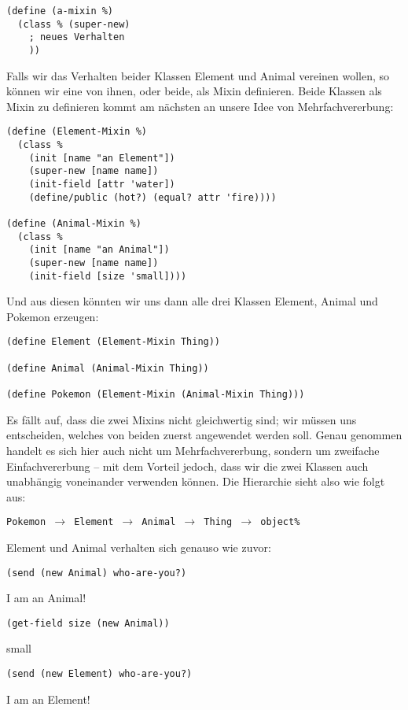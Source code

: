 \begin{lstlisting}
(define (a-mixin %)
  (class % (super-new)
    ; neues Verhalten
    ))
\end{lstlisting}

Falls wir das Verhalten beider Klassen Element und Animal vereinen wollen, so können wir eine von ihnen, oder beide, als Mixin definieren. Beide Klassen als Mixin zu definieren kommt am nächsten an unsere Idee von Mehrfachvererbung:

\begin{lstlisting}
(define (Element-Mixin %)
  (class % 
    (init [name "an Element"])
    (super-new [name name])
    (init-field [attr 'water])
    (define/public (hot?) (equal? attr 'fire))))

(define (Animal-Mixin %)
  (class %
    (init [name "an Animal"])
    (super-new [name name])
    (init-field [size 'small])))
\end{lstlisting}

Und aus diesen könnten wir uns dann alle drei Klassen Element, Animal und Pokemon erzeugen:
\begin{lstlisting}
(define Element (Element-Mixin Thing))

(define Animal (Animal-Mixin Thing))
 
(define Pokemon (Element-Mixin (Animal-Mixin Thing)))
\end{lstlisting}

Es fällt auf, dass die zwei Mixins nicht gleichwertig sind; wir müssen uns entscheiden, welches von beiden zuerst angewendet werden soll. Genau genommen handelt es sich hier auch nicht um Mehrfachvererbung, sondern um zweifache Einfachvererbung -- mit dem Vorteil jedoch, dass wir die zwei Klassen auch unabhängig voneinander verwenden können. Die Hierarchie sieht also wie folgt aus:

\texttt{Pokemon $\rightarrow$ Element $\rightarrow$ Animal $\rightarrow$ Thing $\rightarrow$ object\%}

Element und Animal verhalten sich genauso wie zuvor:

\begin{lstlisting}
(send (new Animal) who-are-you?)
\end{lstlisting}
{\routput {\qq}I am an Animal!\qq}

\begin{lstlisting}
(get-field size (new Animal))
\end{lstlisting}
{\rsymbol small}

\begin{lstlisting}
(send (new Element) who-are-you?)
\end{lstlisting}
{\routput {\qq}I am an Element!\qq}

